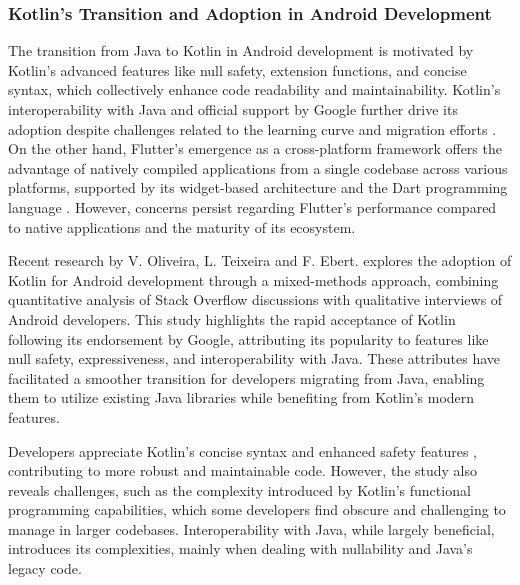 \subsubsection*{Kotlin's Transition and Adoption in Android Development}
The transition from Java to Kotlin in Android development is motivated by Kotlin's advanced features like null safety, extension functions, and concise syntax, which collectively enhance code readability and maintainability. Kotlin's interoperability with Java and official support by Google further drive its adoption despite challenges related to the learning curve and migration efforts \cite{hegedHus2022static}. On the other hand, Flutter's emergence as a cross-platform framework offers the advantage of natively compiled applications from a single codebase across various platforms, supported by its widget-based architecture and the Dart programming language \cite{mazuera2022taxonomy}. However, concerns persist regarding Flutter's performance compared to native applications and the maturity of its ecosystem.
\par
Recent research by V. Oliveira, L. Teixeira and F. Ebert. \cite{oliveira2020adoption} explores the adoption of Kotlin for Android development through a mixed-methods approach, combining quantitative analysis of Stack Overflow discussions with qualitative interviews of Android developers. This study highlights the rapid acceptance of Kotlin following its endorsement by Google, attributing its popularity to features like null safety, expressiveness, and interoperability with Java. These attributes have facilitated a smoother transition for developers migrating from Java, enabling them to utilize existing Java libraries while benefiting from Kotlin's modern features.
\par
Developers appreciate Kotlin's concise syntax and enhanced safety features \cite{oliveira2020adoption}, contributing to more robust and maintainable code. However, the study also reveals challenges, such as the complexity introduced by Kotlin’s functional programming capabilities, which some developers find obscure and challenging to manage in larger codebases. Interoperability with Java, while largely beneficial, introduces its complexities, mainly when dealing with nullability and Java's legacy code.
\par

